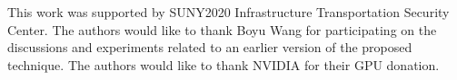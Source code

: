 \documentclass[runningheads]{llncs}
\begin{document}
 This work was supported by SUNY2020 Infrastructure Transportation Security Center. The authors would like to thank Boyu Wang for participating on the discussions and experiments related to an earlier version of the proposed technique. The authors would like to thank NVIDIA for their GPU donation. 



\end{document}
